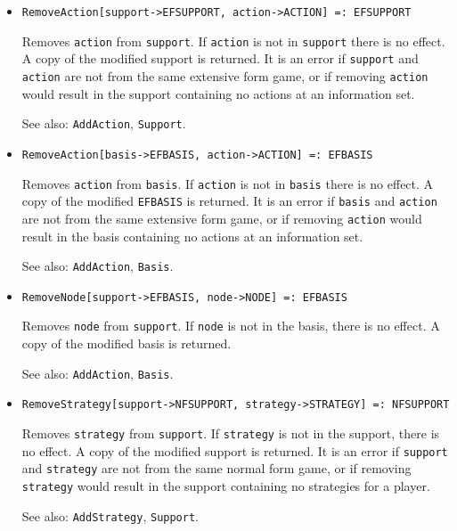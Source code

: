 \begin{itemize}
\item{}
\protect \large \begin{verbatim}
RemoveAction[support->EFSUPPORT, action->ACTION] =: EFSUPPORT 
\end{verbatim}\normalsize
\bd
Removes \verb+action+ from \verb+support+.  If
\verb+action+ is not in \verb+support+ there is no
effect.  A copy of the modified support is returned.  It is an error
if \verb+support+ and \verb+action+ are not from the same extensive
form game, or if removing \verb+action+ would result in the support
containing no actions at an information set.
\item [See also:] \verb+AddAction+, \verb+Support+.
\ed

\item{}
\protect \large \begin{verbatim}
RemoveAction[basis->EFBASIS, action->ACTION] =: EFBASIS 
\end{verbatim}\normalsize
\bd
Removes \verb+action+ from \verb+basis+.  If
\verb+action+ is not in \verb+basis+ there is no
effect.  A copy of the modified \verb+EFBASIS+ is returned.  It is an error
if \verb+basis+ and \verb+action+ are not from the same extensive
form game, or if removing \verb+action+ would result in the basis
containing no actions at an information set.
\item [See also:] \verb+AddAction+, \verb+Basis+.
\ed

\item{}
\protect \large \begin{verbatim}
RemoveNode[support->EFBASIS, node->NODE] =: EFBASIS 
\end{verbatim}\normalsize

\bd
Removes \verb+node+ from \verb+support+.  If \verb+node+ is not in
the basis, there is no effect.  A copy of the modified basis is
returned.  
\item [See also:] \verb+AddAction+, \verb+Basis+.
\ed

\item{}
\protect \large \begin{verbatim}
RemoveStrategy[support->NFSUPPORT, strategy->STRATEGY] =: NFSUPPORT 
\end{verbatim}\normalsize

\bd
Removes \verb+strategy+ from \verb+support+.  If \verb+strategy+ is not in
the support, there is no effect.  A copy of the modified support is
returned.  It is an error if \verb+support+ and \verb+strategy+ are
not from the same normal form game, or if removing \verb+strategy+
would result in the support containing no strategies for a player.
\item [See also:] \verb+AddStrategy+, \verb+Support+.
\ed


\end{itemize}
